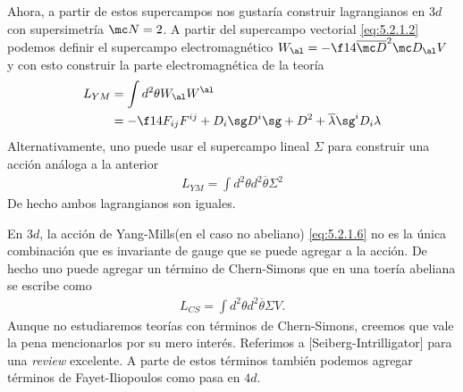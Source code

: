 Ahora, a partir de estos supercampos nos gustaría construir lagrangianos en $3d$ con supersimetría $\mc N=2$. A partir del supercampo vectorial \eqref{eq:5.2.1.2} podemos definir el supercampo electromagnético $W_\al = -\f 14\overline{\mc D}^2\mc D_\al V$ y con esto construir la parte electromagnética de la teoría
\begin{align}
	L_{YM} &= \int d^2\theta W_\al W^\al \label{eq:5.2.1.6} \\
	&= -\f 14 F_{ij}F^{ij}+ D_i\sg D^i\sg+D^2+\overline\lambda\sg^iD_i\lambda
\end{align}
Alternativamente, uno puede usar el supercampo lineal $\Sigma$ para construir una acción análoga a la anterior
\begin{align}
	L_{YM} = \int d^2\theta d^2\overline\theta \Sigma^2
\end{align}
De hecho ambos lagrangianos son iguales.

En $3d$, la acción de Yang-Mills(en el caso no abeliano) \eqref{eq:5.2.1.6} no es la única combinación que es invariante de gauge que se puede agregar a la acción. De hecho uno puede agregar un término de Chern-Simons que en una toería abeliana se escribe como
\begin{align}
	L_{CS} = \int d^2\theta d^2\overline\theta \Sigma V.
\end{align}
Aunque no estudiaremos teorías con términos de Chern-Simons, creemos que vale la pena mencionarlos por su mero interés. Referimos a [Seiberg-Intrilligator] para una \emph{review} excelente. A parte de estos términos también podemos agregar términos de Fayet-Iliopoulos como pasa en $4d$.

